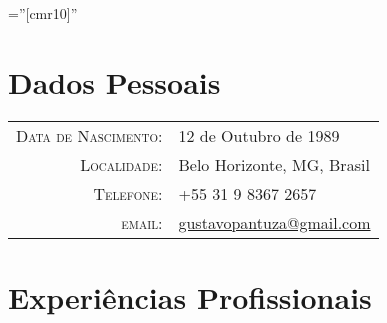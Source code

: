 \documentclass[a4paper,10pt]{article} %
\begin{document}
\pagestyle{empty} %

\font\fb=''[cmr10]'' %





\par{\bigskip\par} %

\section{Dados Pessoais}

\begin{tabular}{rl}
\textsc{Data de Nascimento:} & 12 de Outubro de 1989 \\
\textsc{Localidade:} & Belo Horizonte, MG, Brasil \\
\textsc{Telefone:} & +55 31 9 8367 2657\\
\textsc{email:} & \href{mailto:gustavopantuza@gmail.com}{gustavopantuza@gmail.com}
\end{tabular}





\section{Experiências Profissionais}
\end{document}
